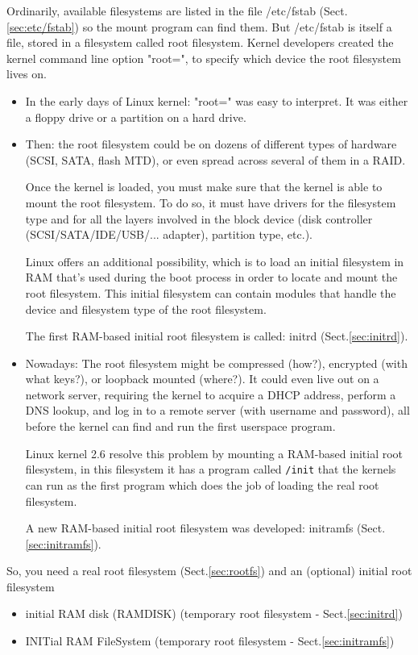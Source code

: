 \begin{mdframed}
Ordinarily, available filesystems are listed in the file /etc/fstab
(Sect.\ref{sec:etc/fstab}) so the mount program can find them. But /etc/fstab is
itself a file, stored in a filesystem called root filesystem.
Kernel developers created the kernel command line option "root=", to specify
which device the root filesystem lives on.
\begin{itemize}
  \item In the early days of Linux kernel:  "root=" was easy to interpret. It
  was either a floppy drive or a partition on a hard drive. 

  \item Then: the root filesystem could be on dozens of different types of
  hardware (SCSI, SATA, flash MTD), or even spread across several of them in a
  RAID.
  
Once the kernel is loaded, you must make sure that the kernel is able to mount
the root filesystem. To do so, it must have drivers for the filesystem type and
for all the layers involved in the block device (disk controller
(SCSI/SATA/IDE/USB/... adapter), partition type, etc.).

Linux offers an additional possibility, which is to load an initial filesystem
in RAM that's used during the boot process in order to locate and mount the root
filesystem. This initial filesystem can contain modules that handle the device
and filesystem type of the root filesystem.

The first RAM-based initial root filesystem is called: initrd
(Sect.\ref{sec:initrd}).
  
  \item Nowadays: 
  The root filesystem might be compressed (how?), encrypted (with what keys?),
  or loopback mounted (where?). It could even live out on a network server,
  requiring the kernel to acquire a DHCP address, perform a DNS lookup, and log
  in to a remote server (with username and password), all before the kernel can
  find and run the first userspace program.
  
  Linux kernel 2.6 resolve this problem by mounting a RAM-based initial root
  filesystem, in this filesystem it has a program called \verb!/init! that the kernels can
  run as the first program which does the job of loading the real root
  filesystem. 
  
  A new RAM-based initial root filesystem was developed:  initramfs
  (Sect.\ref{sec:initramfs}).
\end{itemize}


So, you need a real root filesystem (Sect.\ref{sec:rootfs}) and an
(optional) initial root filesystem
\begin{itemize}
  \item initial RAM disk (RAMDISK) (temporary root filesystem -
  Sect.\ref{sec:initrd})

  \item INITial RAM FileSystem (temporary root filesystem -
  Sect.\ref{sec:initramfs})

\end{itemize}

\end{mdframed}

